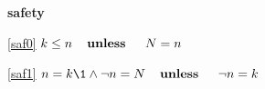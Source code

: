 \textbf{safety}
\begin{block}
\item[ \eqref{saf0} ]$k \le n  \textbf{\quad unless \quad} N = n $ %
\item[ \eqref{saf1} ]$n = k \1\land \neg n = N  \textbf{\quad unless \quad} \neg n = k $ %
\end{block}
